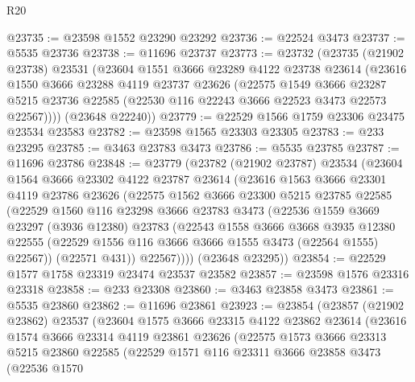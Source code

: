\begin{lexlean}{R20}
\begin{coremodule}
@23735 := @23598 @1552 @23290 @23292
@23736 := @22524 @3473
@23737 := @5535 @23736
@23738 := @11696 @23737
@23773 := @23732
    (@23735
      (@21902 @23738)
      @23531
      (@23604
        @1551
        @3666
        @23289
        @4122
        @23738
        @23614
        (@23616
          @1550
          @3666
          @23288
          @4119
          @23737
          @23626
          (@22575
            @1549
            @3666
            @23287
            @5215
            @23736
            @22585
            (@22530 @116 @22243 @3666 @22523 @3473 @22573 @22567))))
      (@23648 @22240))
@23779 := @22529 @1566 @1759 @23306 @23475 @23534 @23583
@23782 := @23598 @1565 @23303 @23305
@23783 := @233 @23295
@23785 := @3463 @23783 @3473
@23786 := @5535 @23785
@23787 := @11696 @23786
@23848 := @23779
    (@23782
      (@21902 @23787)
      @23534
      (@23604
        @1564
        @3666
        @23302
        @4122
        @23787
        @23614
        (@23616
          @1563
          @3666
          @23301
          @4119
          @23786
          @23626
          (@22575
            @1562
            @3666
            @23300
            @5215
            @23785
            @22585
            (@22529
              @1560
              @116
              @23298
              @3666
              @23783
              @3473
              (@22536
                @1559
                @3669
                @23297
                (@3936 @12380)
                @23783
                (@22543
                  @1558
                  @3666
                  @3668
                  @3935
                  @12380
                  @22555
                  (@22529 @1556 @116 @3666 @3666 @1555 @3473 (@22564 @1555) @22567))
                (@22571 @431))
              @22567))))
      (@23648 @23295))
@23854 := @22529 @1577 @1758 @23319 @23474 @23537 @23582
@23857 := @23598 @1576 @23316 @23318
@23858 := @233 @23308
@23860 := @3463 @23858 @3473
@23861 := @5535 @23860
@23862 := @11696 @23861
@23923 := @23854
    (@23857
      (@21902 @23862)
      @23537
      (@23604
        @1575
        @3666
        @23315
        @4122
        @23862
        @23614
        (@23616
          @1574
          @3666
          @23314
          @4119
          @23861
          @23626
          (@22575
            @1573
            @3666
            @23313
            @5215
            @23860
            @22585
            (@22529
              @1571
              @116
              @23311
              @3666
              @23858
              @3473
              (@22536
                @1570

\end{coremodule}
\end{lexlean}

